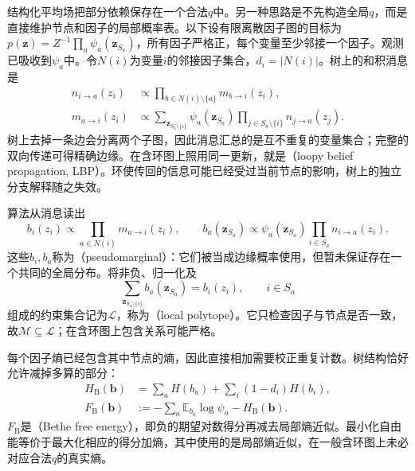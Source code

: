 结构化平均场把部分依赖保存在一个合法$q$中。另一种思路是不先构造全局$q$，而是直接维护节点和因子的局部概率表。以下设有限离散因子图的目标为$p(\bm z)=Z^{-1}\prod_a\psi_a(\bm z_{S_a})$，所有因子严格正，每个变量至少邻接一个因子。观测已吸收到$\psi_a$中。令$N(i)$为变量$i$的邻接因子集合，$d_i=|N(i)|$。树上的和积消息是
\begin{equation}
  \begin{aligned}
    n_{i\to a}(z_i)
      &\propto\prod_{b\in N(i)\setminus\{a\}}m_{b\to i}(z_i),\\
    m_{a\to i}(z_i)
      &\propto\sum_{\bm z_{S_a\setminus\{i\}}}
            \psi_a(\bm z_{S_a})
            \prod_{j\in S_a\setminus\{i\}}n_{j\to a}(z_j).
  \end{aligned}
  \label{eq:pgm-variational-lbp}
\end{equation}
树上去掉一条边会分离两个子图，因此消息汇总的是互不重复的变量集合；完整的双向传递可得精确边缘。在含环图上照用同一更新，就是（loopy belief propagation, LBP）。环使传回的信息可能已经受过当前节点的影响，树上的独立分支解释随之失效。

算法从消息读出
\[
  b_i(z_i)\propto\prod_{a\in N(i)}m_{a\to i}(z_i),
  \qquad
  b_a(\bm z_{S_a})\propto\psi_a(\bm z_{S_a})
                         \prod_{i\in S_a}n_{i\to a}(z_i).
\]
这些$b_i,b_a$称为（pseudomarginal）：它们被当成边缘概率使用，但暂未保证存在一个共同的全局分布。将非负、归一化及
\begin{equation}
  \sum_{\bm z_{S_a\setminus\{i\}}}b_a(\bm z_{S_a})=b_i(z_i),
  \qquad i\in S_a
  \label{eq:pgm-variational-local-consistency}
\end{equation}
组成的约束集合记为$\mathcal L$，称为（local polytope）。它只检查因子与节点是否一致，故$\mathcal M\subseteq\mathcal L$；在含环图上包含关系可能严格。

每个因子熵已经包含其中节点的熵，因此直接相加需要校正重复计数。树结构恰好允许减掉多算的部分：
\begin{equation}
  \begin{aligned}
    H_{\mathrm B}(\bm b)
      &=\sum_aH(b_a)+\sum_i(1-d_i)H(b_i),\\
    F_{\mathrm B}(\bm b)
      &:=-\sum_a\mathbb E_{b_a}\log\psi_a-H_{\mathrm B}(\bm b).
  \end{aligned}
  \label{eq:pgm-variational-bethe}
\end{equation}
$F_{\mathrm B}$是（Bethe free energy），即负的期望对数得分再减去局部熵近似。最小化自由能等价于最大化相应的得分加熵，其中使用的是局部熵近似，在一般含环图上未必对应合法$q$的真实熵。

